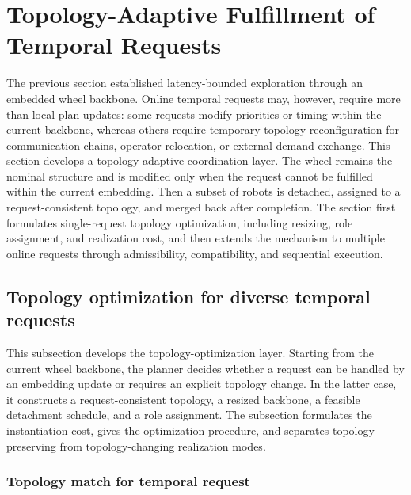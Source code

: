 \section{Topology-Adaptive Fulfillment of Temporal Requests}
\label{ch05:sec:ch05_human}


The previous section established latency-bounded exploration through an embedded
wheel backbone. Online temporal requests may, however, require more than local
plan updates: some requests modify priorities or timing within the current
backbone, whereas others require temporary topology reconfiguration for
communication chains, operator relocation, or external-demand exchange.
This section develops a topology-adaptive coordination layer. The wheel remains
the nominal structure and is modified only when the request cannot be fulfilled
within the current embedding. Then a subset of robots is detached, assigned to a
request-consistent topology, and merged back after completion. The section first
formulates single-request topology optimization, including resizing, role
assignment, and realization cost, and then extends the mechanism to multiple
online requests through admissibility, compatibility, and sequential execution.

\subsection{Topology optimization for diverse temporal requests}
\label{ch05:subsec:requests}

This subsection develops the topology-optimization layer. Starting from the
current wheel backbone, the planner decides whether a request can be handled by
an embedding update or requires an explicit topology change. In the latter
case, it constructs a request-consistent topology, a resized backbone, a
feasible detachment schedule, and a role assignment. The subsection formulates
the instantiation cost, gives the optimization procedure, and separates
topology-preserving from topology-changing realization modes.

\subsubsection{Topology match for temporal request}
\label{ch05:subsubsec:request_problem}

